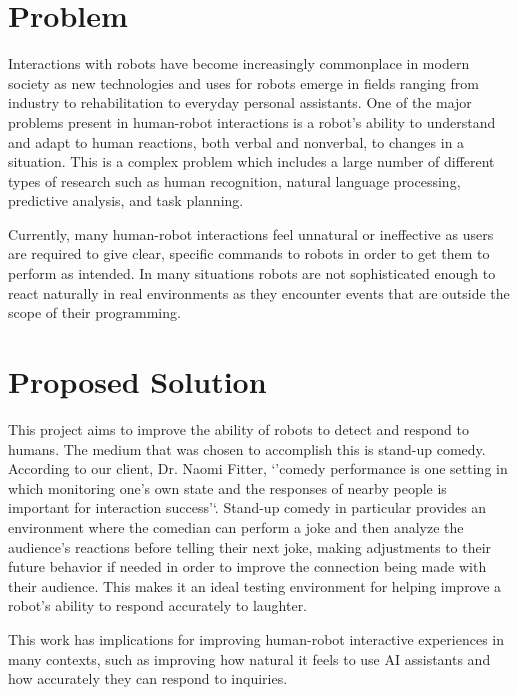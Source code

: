 \documentclass[onecolumn, draftclsnofoot,10pt, compsoc]{IEEEtran}
\begin{document}
\newpage
{}
\tableofcontents
\clearpage

\section{Problem}
Interactions with robots have become increasingly commonplace in modern society as new technologies and uses for robots emerge in fields ranging from industry to rehabilitation to everyday personal assistants. One of the major problems present in human-robot interactions is a robot's ability to understand and adapt to human reactions, both verbal and nonverbal, to changes in a situation. This is a complex problem which includes a large number of different types of research such as human recognition, natural language processing, predictive analysis, and task planning.\par
\vspace{.4cm}
\noindent Currently, many human-robot interactions feel unnatural or ineffective as users are required to give clear, specific commands to robots in order to get them to perform as intended. In many situations robots are not sophisticated enough to react naturally in real environments as they encounter events that are outside the scope of their programming.

\section{Proposed Solution}
This project aims to improve the ability of robots to detect and respond to humans. The medium that was chosen to accomplish this is stand-up comedy. According to our client, Dr. Naomi Fitter, `'comedy performance is one setting in which monitoring one's own state and the responses of nearby people is important for interaction success'`. Stand-up comedy in particular provides an environment where the comedian can perform a joke and then analyze the audience's reactions before telling their next joke, making adjustments to their future behavior if needed in order to improve the connection being made with their audience. This makes it an ideal testing environment for helping improve a robot's ability to respond accurately to laughter.\par
\vspace{.4cm}
\noindent This work has implications for improving human-robot interactive experiences in many contexts, such as improving how natural it feels to use AI assistants and how accurately they can respond to inquiries.
\end{document}
